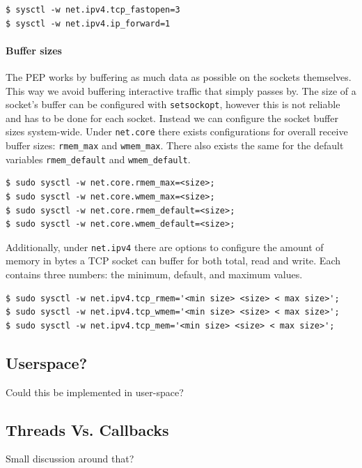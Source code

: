 \documentclass[a4paper,english, 11pt]{report}
\begin{document}
\begin{verbatim}
$ sysctl -w net.ipv4.tcp_fastopen=3
$ sysctl -w net.ipv4.ip_forward=1 
\end{verbatim}

\paragraph{Buffer sizes}
The PEP works by buffering as much data as possible on the sockets themselves. This way we avoid buffering interactive traffic that simply passes by. The size of a socket's buffer can be configured with \verb|setsockopt|, however this is not reliable and has to be done for each socket. Instead we can configure the socket buffer sizes system-wide. Under \verb|net.core| there exists configurations for overall receive buffer sizes: \verb|rmem_max| and \verb|wmem_max|. There also exists the same for the default variables \verb|rmem_default| and \verb|wmem_default|.\\

\begin{verbatim}
$ sudo sysctl -w net.core.rmem_max=<size>;
$ sudo sysctl -w net.core.wmem_max=<size>;
$ sudo sysctl -w net.core.rmem_default=<size>;
$ sudo sysctl -w net.core.wmem_default=<size>;
\end{verbatim}

Additionally, under \verb|net.ipv4| there are options to configure the amount of memory in bytes a TCP socket can buffer for both total, read and write. Each contains three numbers: the minimum, default, and maximum values.


\begin{verbatim}
$ sudo sysctl -w net.ipv4.tcp_rmem='<min size> <size> < max size>';
$ sudo sysctl -w net.ipv4.tcp_wmem='<min size> <size> < max size>';
$ sudo sysctl -w net.ipv4.tcp_mem='<min size> <size> < max size>';
\end{verbatim}

\subsection{Userspace?}
Could this be implemented in user-space?

\subsection{Threads Vs. Callbacks}
Small discussion around that?
\end{document}
